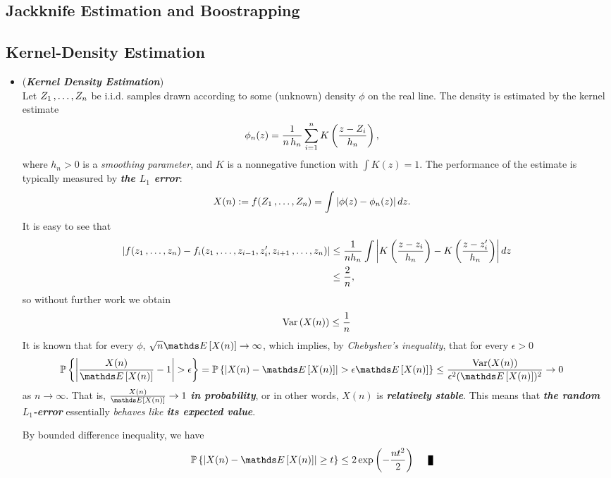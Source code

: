 \documentclass[11pt]{article}
\begin{document}
\subsection{Jackknife Estimation and Boostrapping}
\subsection{Kernel-Density Estimation}
\begin{itemize}
\item \begin{example} (\emph{\textbf{Kernel Density Estimation}})\\
Let $Z_1 \,{,}\ldots{,}\, Z_n$ be i.i.d. samples drawn according to some (unknown) density $\phi$ on the real line. The density is estimated by the kernel estimate
\begin{align*}
\phi_n(z) &=\frac{1}{n\, h_n} \sum_{i=1}^{n}K\left(\frac{z - Z_i}{h_n}\right),
\end{align*} where $h_n > 0$ is a \emph{smoothing parameter}, and $K$ is a nonnegative function with $\int K(z) = 1$. The performance of the estimate is typically measured by \emph{\textbf{the $L_1$ error}}:
\begin{align*}
X(n) &:= f(Z_1 \,{,}\ldots{,}\, Z_n) = \int \left\lvert \phi(z) - \phi_n(z) \right\rvert d z.
\end{align*} It is easy to see that
\begin{align*}
\left\lvert f(z_1 \,{,}\ldots{,}\, z_n) - f_i(z_1 \,{,}\ldots{,}\, z_{i-1}, z_i', z_{i+1} \,{,}\ldots{,}\, z_n) \right\rvert &\le \frac{1}{n h_n}\int \left\lvert K\left(\frac{z - z_i}{h_n}\right) - K\left(\frac{z - z_i'}{h_n}\right) \right\rvert d z\\
&\le \frac{2}{n},
\end{align*} so without further work we obtain
\begin{align*}
\text{Var}\left(X(n)\right) \le \frac{1}{n}
\end{align*}
It is known that for every $\phi$, $\sqrt{n} \E{}{X(n)} \to \infty$, which implies, by \emph{Chebyshev's inequality}, that for every $\epsilon > 0$
\begin{align*}
\bP\set{\abs{\frac{X(n)}{\E{}{X(n)}} - 1} > \epsilon} = \bP\set{\abs{X(n) -\E{}{X(n)}} > \epsilon \E{}{X(n)} } &\le \frac{\text{Var}(X(n))}{\epsilon^2 (\E{}{X(n)})^2}  \to 0
\end{align*} as $n \to \infty$. That is, $\frac{X(n)}{\E{}{X(n)}} \to 1$ \emph{\textbf{in probability}}, or in other words, $X(n)$ is \emph{\textbf{relatively stable}}. This means that \emph{\textbf{the random $L_1$-error}} essentially \emph{behaves like \textbf{its expected value}}.

By bounded difference inequality, we have
\begin{align*}
\bP\set{\abs{X(n) - \E{}{X(n)}} \ge t} &\le 2 \exp\paren{- \frac{n t^2}{2}}  \qed
\end{align*}
\end{example}
\end{itemize}
\end{document}
